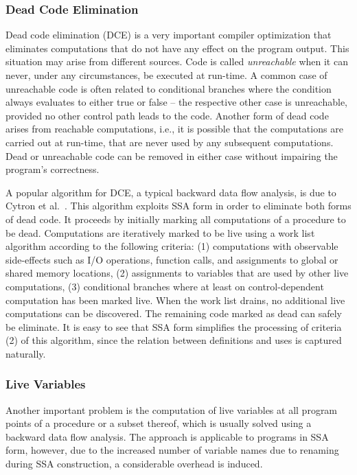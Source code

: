 \subsubsection*{Dead Code Elimination}

Dead code elimination (DCE) is a very important compiler optimization that
eliminates computations that do not have any effect on the program output. This
situation may arise from different sources. Code is called \emph{unreachable}
when it can never, under any circumstances, be executed at run-time. A common
case of unreachable code is often related to conditional branches where the
condition always evaluates to either true or false -- the respective other case
is unreachable, provided no other control path leads to the code.  Another form
of dead code arises from reachable computations, i.e., it is possible that the
computations are carried out at run-time, that are never used by any subsequent
computations. Dead or unreachable code can be removed in either case without
impairing the program's correctness.

A popular algorithm for DCE, a typical backward data flow analysis, is due to
Cytron et al.~\cite{novillo:bib:CFRWZ91}. This algorithm exploits SSA form in
order to eliminate both forms of dead code. It proceeds by initially marking all
computations of a procedure to be dead. Computations are iteratively marked to
be live using a work list algorithm according to the following criteria: (1)
computations with observable side-effects such as I/O operations, function
calls, and assignments to global or shared memory locations, (2) assignments to
variables that are used by other live computations, (3) conditional branches
where at least on control-dependent computation has been marked live. When the
work list drains, no additional live computations can be discovered. The
remaining code marked as dead can safely be eliminate. It is easy to see that
SSA form simplifies the processing of criteria (2) of this algorithm, since the
relation between definitions and uses is captured naturally.

\subsubsection*{Live Variables}

Another important problem is the computation of live variables at all program
points of a procedure or a subset thereof, which is usually solved using a
backward data flow analysis. The approach is applicable to programs in SSA form,
however, due to the increased number of variable names due to renaming during
SSA construction, a considerable overhead is induced.

